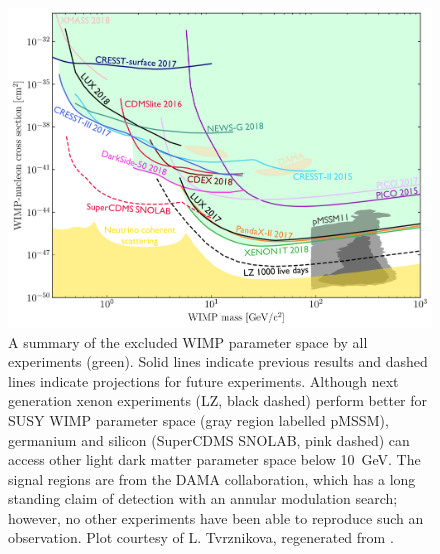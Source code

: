 \begin{figure}[htbp]
\begin{center}
\includegraphics[width=\textwidth]{figures/lxetpcs/limits_all.png}
\caption{A summary of the excluded \acs{WIMP} parameter space by all experiments (green). Solid lines indicate previous results and dashed lines indicate projections for future experiments. Although next generation xenon experiments (LZ, black dashed) perform better for \acs{SUSY} \acs{WIMP} parameter space (gray region labelled pMSSM), germanium and silicon (SuperCDMS SNOLAB, pink dashed) can access other light dark matter parameter space below 10~GeV. The signal regions are from the DAMA collaboration, which has a long standing claim of detection with an annular modulation search; however, no other experiments have been able to reproduce such an observation. Plot courtesy of L. Tvrznikova, regenerated from \cite{snowmass}. }
\label{fig:WIMPblobs}
\end{center}
\end{figure}



\FloatBarrier
